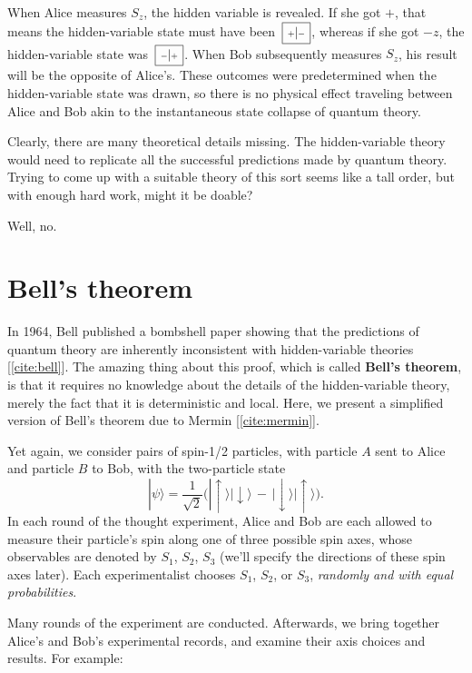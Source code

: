 \documentclass[prx,12pt]{revtex4-2}
\def\hvbox[#1]#2{\,\boxed{\scalebox{0.7}{$\,#1$}|\scalebox{0.7}{$#2\,$}}}
\begin{document}
When Alice measures $S_z$, the hidden variable is revealed.  If she
got $+$, that means the hidden-variable state must have been
$\hvbox[+]{-}$, whereas if she got $-z$, the hidden-variable state was
$\hvbox[-]{+}$.  When Bob subsequently measures $S_z$, his result will
be the opposite of Alice's.  These outcomes were predetermined when
the hidden-variable state was drawn, so there is no physical effect
traveling between Alice and Bob akin to the instantaneous state
collapse of quantum theory.

Clearly, there are many theoretical details missing.  The
hidden-variable theory would need to replicate all the successful
predictions made by quantum theory.  Trying to come up with a suitable
theory of this sort seems like a tall order, but with enough hard
work, might it be doable?

Well, no.

\section{Bell's theorem}
\label{sec:bell}

In 1964, Bell published a bombshell paper showing that the predictions
of quantum theory are inherently inconsistent with hidden-variable
theories [\ref{cite:bell}].  The amazing thing about this proof, which
is called \textbf{Bell's theorem}, is that it requires no knowledge
about the details of the hidden-variable theory, merely the fact that
it is deterministic and local.  Here, we present a simplified version
of Bell's theorem due to Mermin [\ref{cite:mermin}].

Yet again, we consider pairs of spin-1/2 particles, with particle $A$
sent to Alice and particle $B$ to Bob, with the two-particle state
\begin{equation}
  |\psi\rangle = \frac{1}{\sqrt{2}} \Big(|\!\uparrow\rangle|\!\downarrow\rangle \,-\, |\!\downarrow\rangle|\!\uparrow\rangle\Big).
  \label{bellsinglet}
\end{equation}
In each round of the thought experiment, Alice and Bob are each
allowed to measure their particle's spin along one of three possible
spin axes, whose observables are denoted by $S_1$, $S_2$, $S_3$ (we'll
specify the directions of these spin axes later).  Each
experimentalist chooses $S_1$, $S_2$, or $S_3$, \textit{randomly and
  with equal probabilities}.

Many rounds of the experiment are conducted.  Afterwards, we bring
together Alice's and Bob's experimental records, and examine their
axis choices and results.  For example:
\end{document}
